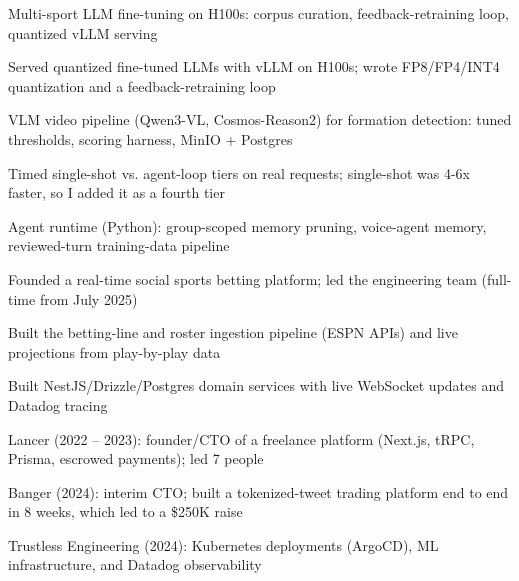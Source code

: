 \documentclass[print]{jack-resume}
\begin{document}
\begin{tightemize}
    \item Multi-sport LLM fine-tuning on H100s: corpus curation, feedback-retraining loop, quantized vLLM serving
    \item Served quantized fine-tuned LLMs with vLLM on H100s; wrote FP8/FP4/INT4 quantization and a feedback-retraining loop
    \item VLM video pipeline (Qwen3-VL, Cosmos-Reason2) for formation detection: tuned thresholds, scoring harness, MinIO + Postgres
    \item Timed single-shot vs. agent-loop tiers on real requests; single-shot was 4-6x faster, so I added it as a fourth tier
    \item Agent runtime (Python): group-scoped memory pruning, voice-agent memory, reviewed-turn training-data pipeline
\end{tightemize}
\sectionsep

\begin{tightemize}
    \item Founded a real-time social sports betting platform; led the engineering team (full-time from July 2025)
    \item Built the betting-line and roster ingestion pipeline (ESPN APIs) and live projections from play-by-play data
    \item Built NestJS/Drizzle/Postgres domain services with live WebSocket updates and Datadog tracing
\end{tightemize}
\sectionsep

\begin{tightemize}
    \item Lancer (2022 -- 2023): founder/CTO of a freelance platform (Next.js, tRPC, Prisma, escrowed payments); led 7 people
    \item Banger (2024): interim CTO; built a tokenized-tweet trading platform end to end in 8 weeks, which led to a \$250K raise
    \item Trustless Engineering (2024): Kubernetes deployments (ArgoCD), ML infrastructure, and Datadog observability
\end{tightemize}
\sectionsep
\end{document}
